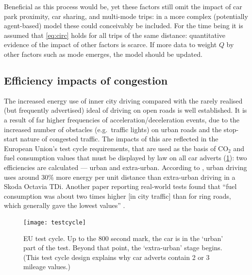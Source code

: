 Beneficial as this process would be, yet these factors still omit
the impact of car park proximity, car sharing,
and multi-mode trips: in a more complex (potentially agent-based) model these
could conceivably be included.
For the time being it is assumed that \cref{eq:circ} holds for
all trips of the same distance: quantitative evidence of the impact of other
factors is scarce. If more data to weight $Q$ by other factors such
as mode emerges, the model should be updated.

\subsection{Efficiency impacts of congestion}

The increased energy use of inner city driving compared with the rarely
realised (but frequently advertised) ideal of driving on open roads is
well established.
It is a result of far higher frequencies of acceleration/deceleration
events, due to the increased number of obstacles (e.g.~traffic lights) on
urban roads and the stop-start nature of congested traffic.
The impacts of this are reflected in the European Union's test cycle
requirements, that are used as the basis of CO$_{2}$ and fuel consumption
values that must be displayed by law on all car adverts (\cref{f:testcycle}):
two efficiencies are calculated --- urban and extra-urban. According to
\citet{Pelkmans2006}, urban driving uses around 30\% more energy per unit distance
than extra-urban driving in a Skoda Octavia TDi. Another paper reporting
real-world tests found that ``fuel consumption was about two times higher
[in city traffic] than for ring roads, which generally gave the lowest values''
\citep[p.~4649]{Vlieger2000}.

\begin{figure}[h]
  \centerline{
    \texttt{[image: testcycle]}}
  \caption[EU test cycle]{EU test cycle. Up to the 800 second mark,
  the car is in the `urban' part of the test. Beyond that point,
  the `extra-urban' stage begins.(This test cycle design explains
  why car adverts contain 2 or 3 mileage values.)}
  \label{f:testcycle}
\end{figure}

